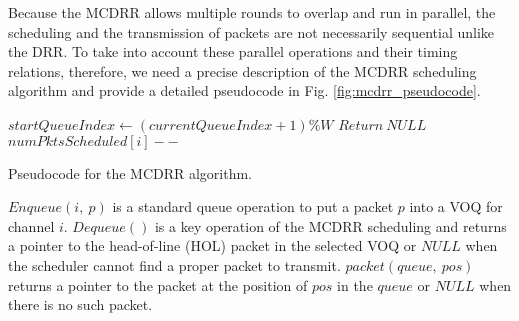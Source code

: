 \documentclass[conference,letterpaper]{IEEEtran}
\begin{document}
Because the MCDRR allows multiple rounds to overlap and run in parallel, the
scheduling and the transmission of packets are not necessarily sequential unlike
the DRR. To take into account these parallel operations and their timing
relations, therefore, we need a precise description of the MCDRR scheduling
algorithm and provide a detailed pseudocode in Fig. \ref{fig:mcdrr_pseudocode}.
\begin{algorithm}[hbtp]
  \Initialization{}\;
  \BlankLine
  \;
  \BlankLine
  \Dequeue{}\;
  $startQueueIndex \leftarrow (currentQueueIndex + 1) \% W$\;
  $Return~NULL$\;
  \BlankLine
  \;
  $numPktsScheduled[i]--$\;
  \caption{Pseudocode for the MCDRR algorithm.}
  \label{fig:mcdrr_pseudocode}
\end{algorithm}

$Enqueue(i,~p)$ is a standard queue operation to put a packet $p$ into a VOQ for
channel $i$. $Dequeue()$ is a key operation of the MCDRR scheduling and returns
a pointer to the head-of-line (HOL) packet in the selected VOQ or $NULL$ when
the scheduler cannot find a proper packet to transmit. $packet(queue,~pos)$
returns a pointer to the packet at the position of $pos$ in the $queue$ or
$NULL$ when there is no such packet.
\end{document}
